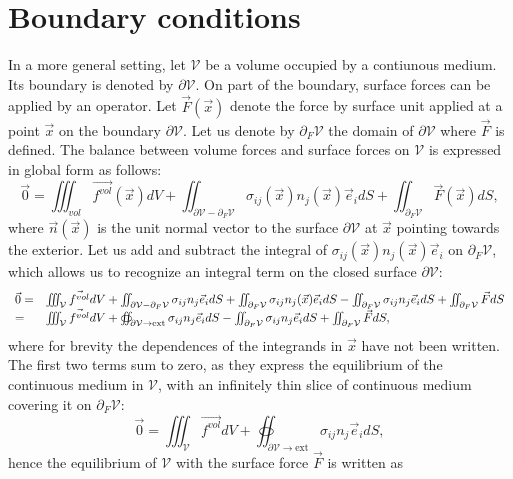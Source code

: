 \documentclass[DIV=12]{article}
\newcommand{\vol}{\mathcal{V}}
\newcommand{\intVol}{\iiint}
\newcommand{\intSurf}{\oiint}
\newcommand{\fVol}{\vec{f^{vol}}}
\begin{document}
\section{Boundary conditions}

In a more general setting, let $\mathcal{V}$ be a 
 volume occupied by a contiunous medium. Its boundary 
 is denoted by $\partial \vol$. On part of the boundary, surface
 forces can be applied by an operator. Let $\vec{F}(\vec{x})$ denote the
 force by surface unit applied at a point $\vec{x}$ on the boundary $\partial\vol$.
 Let us denote by $\partial_{F}\vol$ the domain of $\partial\vol$ where 
 $\vec{F}$ is defined. The balance between volume
 forces and surface forces on $\vol$ is expressed in global form as follows:\\
 \begin{equation}
\vec{0} = \intVol_{vol} \fVol(\vec{x}) dV   + \iint_{\partial\vol -\partial_{F}\vol} \sigma_{ij}(\vec{x})n_j(\vec{x})\vec{e}_i dS+ \iint_{\partial_{F}\vol} \vec{F}(\vec{x}) dS,
 \end{equation}
 where $\vec{n}(\vec{x})$ is the unit  normal vector to the surface $\partial \vol$ at $\vec{x}$ pointing towards the exterior.
Let us add and subtract the integral of $\sigma_{ij}(\vec{x})n_j(\vec{x})\vec{e}_i $ on $\partial_F\vol$, which allows
 us to recognize an integral term on the closed surface $\partial\vol$:
\[
   \begin{array}{l l }
\vec{0}   = &   \intVol_{\vol} \fVol dV   + \iint_{\partial\vol -\partial_{F}\vol} \sigma_{ij} n_j \vec{e}_i dS +
                 \iint_{\partial_{F}\vol} \sigma_{ij} n_j(\vec{x})\vec{e}_i dS - \iint_{\partial_{F}\vol} \sigma_{ij}n_j \vec{e}_i dS  + \iint_{\partial_{F}\vol} \vec{F} dS \\
    =&  \intVol_{\vol} \fVol dV   + \intSurf_{\partial\vol\rightarrow {\mathrm{ext}}} \sigma_{ij} n_j \vec{e}_i dS - \iint_{\partial_{F}\vol} \sigma_{ij} n_j \vec{e}_i dS  + \iint_{\partial_{F}\vol} \vec{F}  dS,
   \end{array}
\]
 where for brevity the dependences of the integrands in $\vec{x}$ have not been written. 
The first two terms sum to zero, as they express the equilibrium of 
 the continuous medium in $\vol$, with an infinitely thin slice of continuous medium 
 covering it on $\partial_{F}\vol$:
\begin{equation}
\vec{0}   =   \intVol_{\vol} \fVol dV   + \intSurf_{\partial\vol\rightarrow {\mathrm{ext}} } \sigma_{ij} n_j \vec{e}_i dS,
\end{equation}
hence the equilibrium of  $\vol$ with the surface force $\vec{F}$  is written as 
\end{document}
